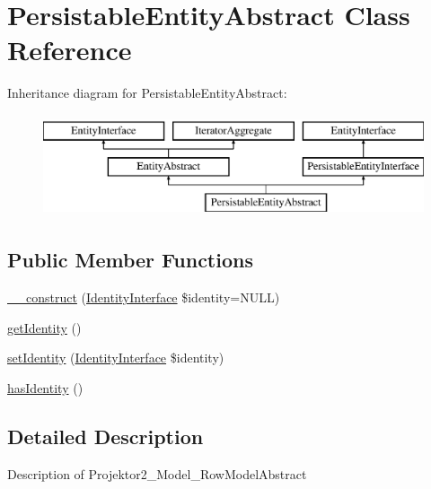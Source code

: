 \hypertarget{class_pes_1_1_entity_1_1_persistable_1_1_persistable_entity_abstract}{}\section{Persistable\+Entity\+Abstract Class Reference}
\label{class_pes_1_1_entity_1_1_persistable_1_1_persistable_entity_abstract}
Inheritance diagram for Persistable\+Entity\+Abstract\+:\begin{figure}[H]
\begin{center}
\leavevmode
\includegraphics[height=3.000000cm]{class_pes_1_1_entity_1_1_persistable_1_1_persistable_entity_abstract}
\end{center}
\end{figure}
\subsection*{Public Member Functions}
\begin{DoxyCompactItemize}
\item 
\mbox{\hyperlink{class_pes_1_1_entity_1_1_persistable_1_1_persistable_entity_abstract_ade324dfe80f3fec45e856634aa54e751}{\+\_\+\+\_\+construct}} (\mbox{\hyperlink{interface_pes_1_1_entity_1_1_persistable_1_1_identity_interface}{Identity\+Interface}} \$identity=N\+U\+LL)
\item 
\mbox{\hyperlink{class_pes_1_1_entity_1_1_persistable_1_1_persistable_entity_abstract_a8d0c4e1299abe333956fca30fdc44143}{get\+Identity}} ()
\item 
\mbox{\hyperlink{class_pes_1_1_entity_1_1_persistable_1_1_persistable_entity_abstract_a4b592a84880ccd2d9e5483195ca2fb71}{set\+Identity}} (\mbox{\hyperlink{interface_pes_1_1_entity_1_1_persistable_1_1_identity_interface}{Identity\+Interface}} \$identity)
\item 
\mbox{\hyperlink{class_pes_1_1_entity_1_1_persistable_1_1_persistable_entity_abstract_a72a7a2baac16885815a76822b696f62b}{has\+Identity}} ()
\end{DoxyCompactItemize}


\subsection{Detailed Description}
Description of Projektor2\+\_\+\+Model\+\_\+\+Row\+Model\+Abstract

